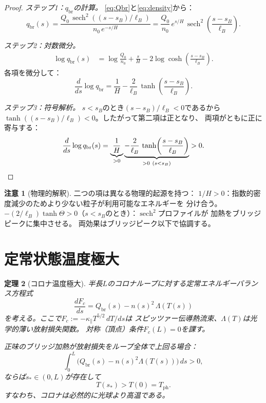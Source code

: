 \documentclass[12pt]{article}
\theoremstyle{plain}
\newtheorem{theorem}{定理}[section]
\theoremstyle{definition}
\newtheorem{remark}[theorem]{注意}
\numberwithin{equation}{section}
\newcommand{\br}{\mathrm{br}}
\newcommand{\ph}{\mathrm{ph}}
\DeclareMathOperator{\sech}{sech}
\begin{document}
\begin{proof}
\emph{ステップ1：$q_{\br}$の計算。}
\eqref{eq:Qbr}と\eqref{eq:density}から：
\begin{equation}
q_{\br}(s) = \frac{Q_0\,\sech^2((s-s_B)/\ell_B)}
{n_0\,e^{-s/H}}
= \frac{Q_0}{n_0}\,e^{s/H}\,
\sech^2\!\left(\frac{s-s_B}{\ell_B}\right).
\end{equation}

\emph{ステップ2：対数微分。}
\begin{align}
\log q_{\br}(s) &= \log\frac{Q_0}{n_0}
+ \frac{s}{H}
- 2\log\cosh\!\left(\frac{s-s_B}{\ell_B}\right).
\end{align}
各項を微分して：
\begin{equation}
\frac{d}{ds}\log q_{\br}
= \frac{1}{H}
- \frac{2}{\ell_B}\,\tanh\!\left(\frac{s-s_B}{\ell_B}\right).
\end{equation}

\emph{ステップ3：符号解析。}
$s<s_B$のとき$(s-s_B)/\ell_B<0$であるから
$\tanh((s-s_B)/\ell_B)<0$。したがって第二項は正となり、
両項がともに正に寄与する：
\begin{equation}
\frac{d}{ds}\log q_{\br}(s)
= \underbrace{\frac{1}{H}}_{>0}
\underbrace{- \frac{2}{\ell_B}\,\tanh\!\left(\frac{s-s_B}{\ell_B}\right)}_{>0\ (s<s_B)}
> 0.\qedhere
\end{equation}
\end{proof}

\begin{remark}[物理的解釈]
二つの項は異なる物理的起源を持つ：
$1/H>0$：指数的密度減少のためより少ない粒子が利用可能なエネルギーを
分け合う。
$-(2/\ell_B)\tanh\Theta>0$（$s<s_B$のとき）：$\sech^2$プロファイルが
加熱をブリッジピークに集中させる。
両効果はブリッジピーク以下で協調する。
\end{remark}


\section{定常状態温度極大}\label{sec:tempmax}

\begin{theorem}[コロナ温度極大]\label{thm:tempmax}
半長$L$のコロナループに対する定常エネルギーバランス方程式
\begin{equation}\label{eq:energybal}
\frac{dF_c}{ds} = Q_{\br}(s) - n(s)^2\,\Lambda(T(s))
\end{equation}
を考える。ここで$F_c:=-\kappa_\parallel T^{5/2}\,dT/ds$は
スピッツァー伝導熱流束、$\Lambda(T)$は光学的薄い放射損失関数。
対称（頂点）条件$F_c(L)=0$を課す。

正味のブリッジ加熱が放射損失をループ全体で上回る場合：
\begin{equation}\label{eq:netcondition}
\int_0^L \bigl(Q_{\br}(s)-n(s)^2\Lambda(T(s))\bigr)\,ds > 0,
\end{equation}
ならば$s_*\in(0,L)$が存在して
\begin{equation}\label{eq:Tmax}
\boxed{T(s_*) > T(0) = T_{\ph}.}
\end{equation}
すなわち、コロナは必然的に光球より高温である。
\end{theorem}
\end{document}
